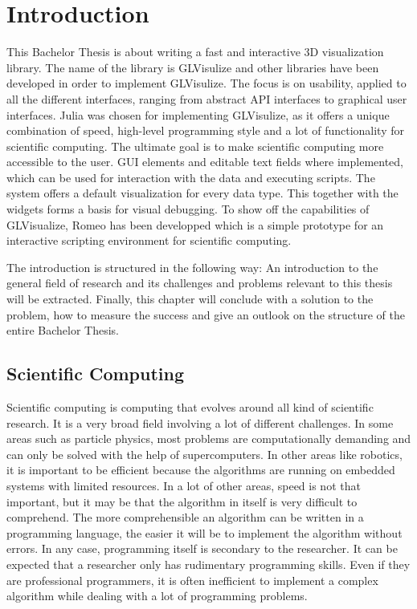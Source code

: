 \section{Introduction}
This Bachelor Thesis is about writing a fast and interactive 3D visualization library.
The name of the library is GLVisulize and other libraries have been developed in order to implement GLVisulize. 
The focus is on usability, applied to all the different interfaces, ranging from abstract \ac{API} interfaces to graphical user interfaces. 
Julia was chosen for implementing GLVisulize, as it offers a unique combination of speed, high-level programming style and a lot of functionality for scientific computing.
The ultimate goal is to make scientific computing more accessible to the user.
\ac{GUI} elements and editable text fields where implemented, which can be used for interaction with the data and executing scripts.
The system offers a default visualization for every data type. This together with the widgets forms a basis for visual debugging.
To show off the capabilities of GLVisualize, Romeo has been developped which is a simple prototype for an interactive scripting environment for scientific computing.

The introduction is structured in the following way:
An introduction to the general field of research and its challenges and problems relevant to this thesis will be extracted.
Finally, this chapter will conclude with a solution to the problem, how to measure the success and give an outlook on the structure of the entire Bachelor Thesis.


\subsection{Scientific Computing}

Scientific computing is computing that evolves around all kind of scientific research.
It is a very broad field involving a lot of different challenges. 
In some areas such as particle physics, most problems are computationally demanding and can only be solved with the help of supercomputers.
In other areas like robotics, it is important to be efficient because the algorithms are running on embedded systems with limited resources. 
In a lot of other areas, speed is not that important, but it may be that the algorithm in itself is very difficult to comprehend. 
The more comprehensible an algorithm can be written in a programming language, the easier it will be to implement the algorithm without errors.
In any case, programming itself is secondary to the researcher.
It can be expected that a researcher only has rudimentary programming skills. 
Even if they are professional programmers, it is often inefficient to implement a complex algorithm while dealing with a lot of programming problems.

